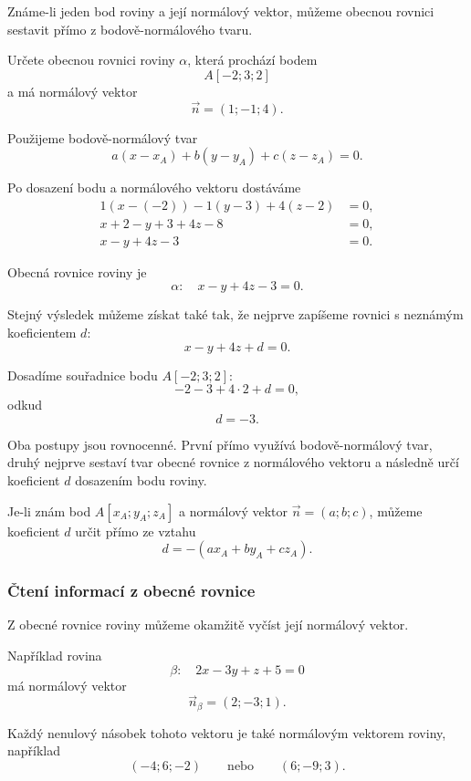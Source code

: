 Známe-li jeden bod roviny a její normálový vektor, můžeme obecnou
rovnici sestavit přímo z bodově-normálového tvaru.

\begin{example}
    \label{exa:General_plane_point_normal}

    Určete obecnou rovnici roviny $\alpha$, která prochází bodem
    \[
        A[-2;3;2]
    \]
    a má normálový vektor
    \[
        \vec{n}=(1;-1;4).
    \]

    Použijeme bodově-normálový tvar
    \[
        a(x-x_A)+b(y-y_A)+c(z-z_A)=0.
    \]

    Po dosazení bodu a normálového vektoru dostáváme
    \begin{align*}
        1(x-(-2))-1(y-3)+4(z-2)&=0,\\
        x+2-y+3+4z-8&=0,\\
        x-y+4z-3&=0.
    \end{align*}

    Obecná rovnice roviny je
    \[
        \alpha:\quad x-y+4z-3=0.
    \]
\end{example}

Stejný výsledek můžeme získat také tak, že nejprve zapíšeme rovnici
s neznámým koeficientem $d$:
\[
    x-y+4z+d=0.
\]

Dosadíme souřadnice bodu $A[-2;3;2]$:
\[
    -2-3+4\cdot2+d=0,
\]
odkud
\[
    d=-3.
\]

Oba postupy jsou rovnocenné. První přímo využívá bodově-normálový tvar,
druhý nejprve sestaví tvar obecné rovnice z normálového vektoru
a následně určí koeficient $d$ dosazením bodu roviny.

\begin{remark}
    Je-li znám bod $A[x_A;y_A;z_A]$ a normálový vektor
    $\vec{n}=(a;b;c)$, můžeme koeficient $d$ určit přímo ze vztahu
    \[
        d=-(ax_A+by_A+cz_A).
    \]
\end{remark}


\subsubsection{Čtení informací z obecné rovnice}
\label{subsubsec:Reading_general_plane_equation}

Z obecné rovnice roviny můžeme okamžitě vyčíst její normálový vektor.

Například rovina
\[
    \beta:\quad 2x-3y+z+5=0
\]
má normálový vektor
\[
    \vec{n}_{\beta}=(2;-3;1).
\]

Každý nenulový násobek tohoto vektoru je také normálovým vektorem
roviny, například
\[
    (-4;6;-2)
    \qquad\text{nebo}\qquad
    (6;-9;3).
\]

